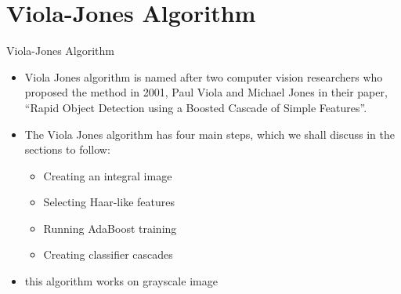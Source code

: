 \documentclass[aspectratio=169]{beamer}
\begin{document}
\section{Viola-Jones Algorithm}
\begin{frame}{Viola-Jones Algorithm}
    \begin{itemize}
        \item Viola Jones algorithm is named after two computer vision researchers who proposed the method in 2001, Paul Viola and Michael Jones in their paper, “Rapid Object Detection using a Boosted Cascade of Simple Features”\cite{990517}.
        \item The Viola Jones algorithm has four main steps, which we shall discuss in the sections to follow:
              \begin{itemize}
                  \item Creating an integral image
                  \item Selecting Haar-like features
                  \item Running AdaBoost training
                  \item Creating classifier cascades
              \end{itemize}
        \item this algorithm works on grayscale image
    \end{itemize}
\end{frame}
\end{document}
